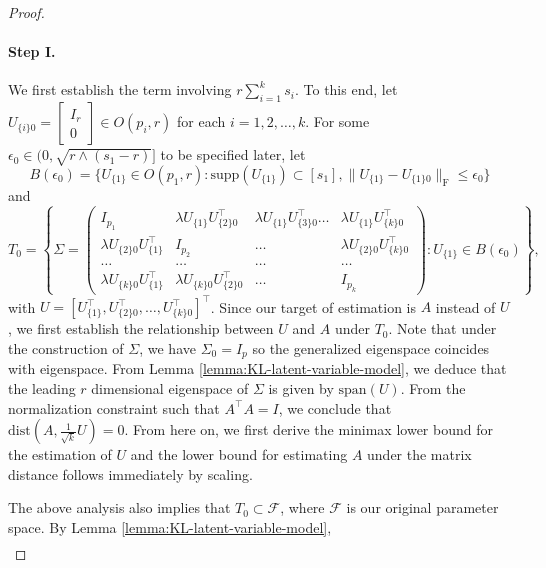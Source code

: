 \documentclass[11pt]{article}
\newcommand{\supp}{\mathrm{supp}}
\newcommand{\dc}[1]{\{#1\}} %
\newcommand{\dist}{\mathrm{dist}}
\newcommand{\0}{{\mathbf{0}}}
\begin{document}
\begin{proof}
\paragraph{Step I.} We first establish the term involving $r\sum_{i=1}^k s_i$. To this end, let $U_{\dc{i}0}=\begin{bmatrix}
I_r\\0
\end{bmatrix}\in O(p_i, r)$ for each $i=1, 2, \dots, k$. For some $\epsilon_0\in(0, \sqrt{r\wedge (s_1-r)}]$ to be specified later, let \begin{equation*}
    B(\epsilon_0)=\{U_{\dc{1}}\in O(p_1,r): \supp(U_{\dc{1}})\subset [s_1], \|U_{\dc{1}}-U_{\dc{1}0}\|_\mathrm{F}\leq \epsilon_0\}
\end{equation*}
and \begin{equation*}
    T_0=\left\{\Sigma = \begin{pmatrix}
    I_{p_1} & \lambda U_{\dc{1}}U_{\dc{2}0}^\top &\lambda U_{\dc{1}}U_{\dc{3}0}^\top \dots & \lambda U_{\dc{1}}U_{\dc{k}0}^\top\\
  \lambda  U_{\dc{2}0}U_{\dc{1}}^\top &I_{p_2} &\dots&\lambda U_{\dc{2}0}U_{\dc{k}0}^\top\\
    \dots & \dots &\dots &\dots\\
  \lambda  U_{\dc{k}0}U_{\dc{1}}^\top &  \lambda U_{\dc{k}0}U_{\dc{2}0}^\top&\dots&
    I_{p_k}
    \end{pmatrix}: U_{\dc{1}}\in B(\epsilon_0)\right\},
\end{equation*}
with $U =\left[U_{\dc{1}}^\top, U_{\dc{2}0}^\top,\dots, U_{\dc{k}0}^\top\right]^\top$. Since our target of estimation is $A$ instead of $U$, we first establish the relationship between $U$ and $A$ under $T_0$. Note that under the construction of $\Sigma$, we have $\Sigma_0 = I_p$ so the generalized eigenspace coincides with eigenspace. From Lemma \ref{lemma:KL-latent-variable-model}, we deduce that the leading $r$ dimensional eigenspace of $\Sigma$ is given by $\mathrm{span}(U)$. From the normalization constraint such that $A^\top A = I$, we conclude that 
    $\dist(A, \frac{1}{\sqrt{k}}U)=0$. 
From here on, we first derive the minimax lower bound for the estimation of $U$ and the lower bound for estimating $A$ under the matrix distance follows immediately by scaling.  \par The above analysis also implies that $T_0\subset\mathcal{F}$, where $\mathcal{F}$ is our original parameter space. By Lemma \ref{lemma:KL-latent-variable-model}, 
\begin{align*}

\end{align*}
\end{proof}
\end{document}
